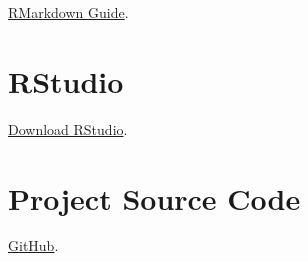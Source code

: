 \documentclass[
]{book}
\begin{document}
\href{https://bookdown.org/yihui/rmarkdown/}{RMarkdown Guide}.

\hypertarget{rstudio}{%
\section*{RStudio}\label{rstudio}}

\href{https://rstudio.com/products/rstudio/download/\#download}{Download RStudio}.

\hypertarget{project-source-code}{%
\section*{Project Source Code}\label{project-source-code}}

\href{https://github.com/Peter-Kedron/COVID-19-Digital-Contact-Tracing-and-Geospatial-Technologies-and-Privacy}{GitHub}.

  
\end{document}
